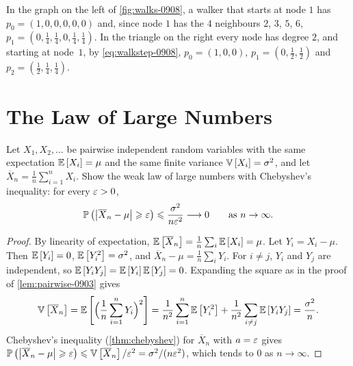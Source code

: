 \begin{example}\label{exa:walks-0908}
    In the graph on the left of \cref{fig:walks-0908}, a walker that starts at node $1$ has
    $p_0 = (1, 0, 0, 0, 0, 0)$ and, since node $1$ has the $4$ neighbours $2$, $3$, $5$, $6$,
    $p_1 = \left(0, \tfrac{1}{4}, \tfrac{1}{4}, 0, \tfrac{1}{4}, \tfrac{1}{4}\right)$. In the triangle
    on the right every node has degree $2$, and starting at node~$1$, by \cref{eq:walkstep-0908},
    $p_0 = (1, 0, 0)$, $p_1 = \left(0, \tfrac{1}{2}, \tfrac{1}{2}\right)$ and
    $p_2 = \left(\tfrac{1}{2}, \tfrac{1}{4}, \tfrac{1}{4}\right)$.
\end{example}

\section{The Law of Large Numbers}

\begin{exercisebox}
\begin{exercise}\label{ex:wlln-0908}\label{thm:wlln-0908}
    Let $X_1, X_2, \dots$ be pairwise independent random variables with the same expectation
    $\operatorname{\mathbb{E}}\left[X_i\right] = \mu$ and the same finite variance $\operatorname{\mathbb{V}}\left[X_i\right] = \sigma^2$, and let
    $\overline{X}_n = \frac{1}{n} \sum_{i=1}^{n} X_i$. Show the weak law of large numbers with
    Chebyshev's inequality: for every $\varepsilon > 0$,
    \[\operatorname{\mathbb{P}}\left(\left\lvert\overline{X}_n - \mu\right\rvert \geqslant \varepsilon\right) \leqslant \frac{\sigma^2}{n \varepsilon^2}
        \longrightarrow 0 \qquad \text{as } n \to \infty.\]
\end{exercise}
\tcblower
\begin{proof}
    By linearity of expectation, $\operatorname{\mathbb{E}}\left[\overline{X}_n\right] = \frac{1}{n} \sum_{i} \operatorname{\mathbb{E}}\left[X_i\right] = \mu$.
    Let $Y_i = X_i - \mu$. Then $\operatorname{\mathbb{E}}\left[Y_i\right] = 0$, $\operatorname{\mathbb{E}}\left[Y_i^2\right] = \sigma^2$, and
    $\overline{X}_n - \mu = \frac{1}{n} \sum_{i} Y_i$. For $i \neq j$, $Y_i$ and $Y_j$ are independent,
    so $\operatorname{\mathbb{E}}\left[Y_i Y_j\right] = \operatorname{\mathbb{E}}\left[Y_i\right] \operatorname{\mathbb{E}}\left[Y_j\right] = 0$. Expanding the square as
    in the proof of \cref{lem:pairwise-0903} gives
    \[\operatorname{\mathbb{V}}\left[\overline{X}_n\right]
        = \operatorname{\mathbb{E}}\left[\Big(\frac{1}{n} \sum_{i=1}^{n} Y_i\Big)^2\right]
        = \frac{1}{n^2} \sum_{i=1}^{n} \operatorname{\mathbb{E}}\left[Y_i^2\right]
        + \frac{1}{n^2} \sum_{i \neq j} \operatorname{\mathbb{E}}\left[Y_i Y_j\right]
        = \frac{\sigma^2}{n}.\]
    Chebyshev's inequality (\cref{thm:chebyshev}) for $\overline{X}_n$ with $a = \varepsilon$ gives
    $\operatorname{\mathbb{P}}\left(\left\lvert\overline{X}_n - \mu\right\rvert \geqslant \varepsilon\right) \leqslant \operatorname{\mathbb{V}}\left[\overline{X}_n\right]/\varepsilon^2
        = \sigma^2/(n \varepsilon^2)$, which tends to $0$ as $n \to \infty$.
\end{proof}
\end{exercisebox}
